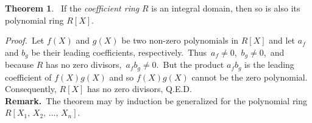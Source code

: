 \documentclass[12pt]{article}
\theoremstyle{definition}
\newtheorem*{thmplain}{Theorem}
\begin{document}
\begin{thmplain}
\, If the {\em coefficient ring} $R$  is an integral domain, then so is also its polynomial ring $R[X]$.
\end{thmplain}

{\em Proof.}\, Let $f(X)$ and $g(X)$ be two non-zero polynomials in $R[X]$ and let $a_f$ and $b_g$ be their leading coefficients, respectively.\, Thus\, $a_f \neq 0$,\, $b_g \neq 0$,\, and because $R$ has no zero divisors,\, $a_fb_g \neq 0$.\, But the product $a_fb_g$ is the leading coefficient of $f(X)g(X)$ and so $f(X)g(X)$ cannot be the zero polynomial.\, Consequently, $R[X]$ has no zero divisors, Q.E.D.\\

\textbf{Remark.}\, The theorem may by induction be generalized for the polynomial ring\, $R[X_1,\,X_2,\,\ldots,\,X_n]$.
\end{document}
